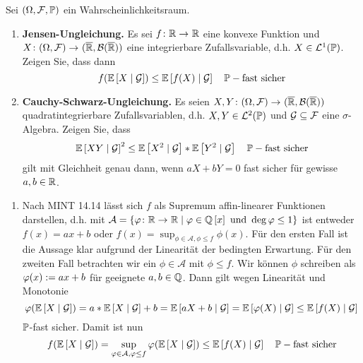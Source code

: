 \begin{exercisePage}
	\begin{homework}
		Sei $(\Omega, \ereignisF, \P)$ ein Wahrscheinlichkeitsraum. 
		\begin{enumerate}[wide, leftmargin=*, nolistsep]
			\item \textbf{Jensen-Ungleichung.} Es sei $\abb{f}{\R}{\R}$ eine konvexe Funktion und $\abb{X}{(\Omega, \ereignisF)}{(\quer{\R}, \borel{\quer{\R}})}$ eine integrierbare Zufallsvariable, d.h. $X \in \L^1(\P)$. Zeigen Sie, dass dann
			\begin{equation*}
				f(\EW[X \mid \mathG]) \le \EW[f(X) \mid \mathG] \quad \P-\text{fast sicher}
			\end{equation*}
			\item \textbf{Cauchy-Schwarz-Ungleichung.} Es seien $\abb{X,Y}{(\Omega, \ereignisF)}{(\quer{\R}, \borel{\quer{\R}})}$ quadratintegrierbare Zufallsvariablen, d.h. $X,Y \in \L^2(\P)$ und $\mathG \subseteq \ereignisF$ eine $\sigma$-Algebra. Zeigen Sie, dass
			\begin{equation*}
				\EW[XY \mid \mathG]^2 \le \EW[X^2 \mid \mathG] * \EW[Y^2 \mid \mathG] \quad \P-\text{fast sicher}
			\end{equation*}
			gilt mit Gleichheit genau dann, wenn $aX+bY = 0$ fast sicher für gewisse $a,b \in \R$.
		\end{enumerate}
	\end{homework}

	\begin{enumerate}[wide, leftmargin=*, label=(zu \alph*)]
		\item Nach MINT 14.14 lässt sich $f$ als Supremum affin-linearer Funktionen darstellen, d.h. mit $\mathcal{A} = \menge{\abb{\phi}{\R}{\R} \mid \phi \in \polynom[\Q][x] \text{ und } \deg\phi \le 1}$ ist entweder $f(x) = ax+b$ oder $f(x) = \sup_{\phi \in \mathcal{A}, \phi \le f} \phi(x)$. Für den ersten Fall ist die Aussage klar aufgrund der Linearität der bedingten Erwartung. Für den zweiten Fall betrachten wir ein $\phi \in \mathcal{A}$ mit $\phi \le f$. Wir können $\phi$ schreiben als $\phi(x) \defeq ax + b$ für geeignete $a,b \in \Q$. Dann gilt wegen Linearität und Monotonie
		\begin{equation*}
			\phi ( \EW[X \mid \mathG] ) = a * \EW[X \mid \mathG] + b = \EW[aX + b \mid \mathG] = \EW[\phi(X) \mid \mathG] \le \EW[f(X) \mid \mathG]
		\end{equation*}
		$\P$-fast sicher.
		Damit ist nun 
		\begin{equation*}
			f(\EW[X \mid \mathG]) = \sup_{\phi \in \mathcal{A}, \phi \le f} \phi(\EW[X \mid \mathG]) \le \EW[f(X) \mid \mathG] \quad \P-\text{fast sicher}
		\end{equation*}
	\end{enumerate}
	

\end{exercisePage}
